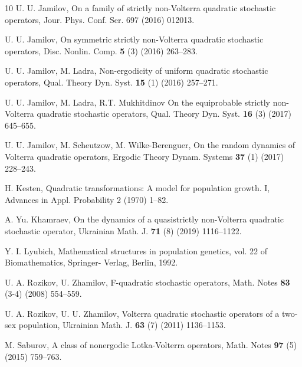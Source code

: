 \documentclass[11pt,reqno]{amsart}
\numberwithin{equation}{section} \setcounter{tocdepth}{1}
\begin{document}
\begin{thebibliography}{10}
 U. U. Jamilov, On a family of strictly non-Volterra quadratic stochastic operators, Jour. Phys. Conf.
Ser. 697 (2016) 012013.

 U. U. Jamilov, On symmetric strictly non-Volterra quadratic stochastic operators,
 Disc. Nonlin. Comp. {\bf 5} (3) (2016) 263--283.


U. U. Jamilov, M. Ladra,   Non-ergodicity of uniform quadratic stochastic operators,
Qual. Theory Dyn. Syst. {\bf 15} (1) (2016) 257--271.

 U. U. Jamilov,  M. Ladra, R.T. Mukhitdinov On the equiprobable strictly non-Volterra quadratic
stochastic operators, Qual. Theory Dyn. Syst. {\bf 16} (3) (2017) 645--655.

 U. U. Jamilov, M. Scheutzow, M. Wilke-Berenguer, On the random dynamics of Volterra quadratic
operators, Ergodic Theory Dynam. Systems {\bf 37} (1) (2017) 228--243.

H. Kesten, Quadratic transformations: A model for population growth. I, Advances in Appl. Probability
2 (1970) 1--82.

 A. Yu. Khamraev, On the dynamics of a quasistrictly non-Volterra quadratic stochastic operator,
Ukrainian Math. J. {\bf 71} (8) (2019) 1116--1122.

 Y. I. Lyubich, Mathematical structures in population genetics, vol. 22 of Biomathematics, Springer-
Verlag, Berlin, 1992.

%

 U. A. Rozikov, U. Zhamilov, F-quadratic stochastic operators, Math. Notes {\bf 83} (3-4) (2008) 554--559.

 U. A. Rozikov, U. U. Zhamilov, Volterra quadratic stochastic operators of a two-sex population,
Ukrainian Math. J. {\bf 63} (7) (2011) 1136--1153.

 M. Saburov, A class of nonergodic Lotka-Volterra operators, Math. Notes {\bf 97} (5) (2015) 759--763.


\end{thebibliography}
\end{document}
